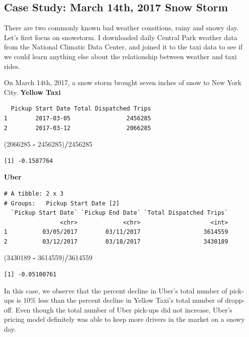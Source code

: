 \documentclass[12pt,twoside]{reedthesis}
\newenvironment{Shaded}{\begin{snugshade}}{\end{snugshade}}
\newcommand{\DecValTok}[1]{\textcolor[rgb]{0.00,0.00,0.81}{#1}}
\newcommand{\StringTok}[1]{\textcolor[rgb]{0.31,0.60,0.02}{#1}}
\newcommand{\OperatorTok}[1]{\textcolor[rgb]{0.81,0.36,0.00}{\textbf{#1}}}
\newcommand{\NormalTok}[1]{#1}
\theoremstyle{definition}
\theoremstyle{definition}
\theoremstyle{definition}
\theoremstyle{remark}
\begin{document}
\subsection{Case Study: March 14th, 2017 Snow
Storm}\label{case-study-march-14th-2017-snow-storm}

There are two commonly known bad weather consitions, rainy and snowy
day. Let's first focus on snowstorm. I downloaded daily Central Park
weather data from the National Climatic Data Center, and joined it to
the taxi data to see if we could learn anything else about the
relationship between weather and taxi rides.

On March 14th, 2017, a snow storm brought seven inches of snow to New
York City. \textbf{Yellow Taxi}
\begin{verbatim}
  Pickup Start Date Total Dispatched Trips
1        2017-03-05                2456285
2        2017-03-12                2066285
\end{verbatim}
\begin{Shaded}
\begin{Highlighting}[]
\NormalTok{(}\DecValTok{2066285} \OperatorTok{-}\StringTok{ }\DecValTok{2456285}\NormalTok{)}\OperatorTok{/}\DecValTok{2456285}
\end{Highlighting}
\end{Shaded}
\begin{verbatim}
[1] -0.1587764
\end{verbatim}
\textbf{Uber}
\begin{verbatim}
# A tibble: 2 x 3
# Groups:   Pickup Start Date [2]
  `Pickup Start Date` `Pickup End Date` `Total Dispatched Trips`
                <chr>             <chr>                    <int>
1          03/05/2017        03/11/2017                  3614559
2          03/12/2017        03/18/2017                  3430189
\end{verbatim}
\begin{Shaded}
\begin{Highlighting}[]
\NormalTok{(}\DecValTok{3430189} \OperatorTok{-}\StringTok{ }\DecValTok{3614559}\NormalTok{)}\OperatorTok{/}\DecValTok{3614559}
\end{Highlighting}
\end{Shaded}
\begin{verbatim}
[1] -0.05100761
\end{verbatim}
In this case, we observe that the percent decline in Uber's total number
of pick-ups is 10\% less than the percent decline in Yellow Taxi's total
number of dropp-off. Even though the total number of Uber pick-ups did
not increase, Uber's pricing model definitely was able to keep more
drivers in the market on a snowy day.
\end{document}
